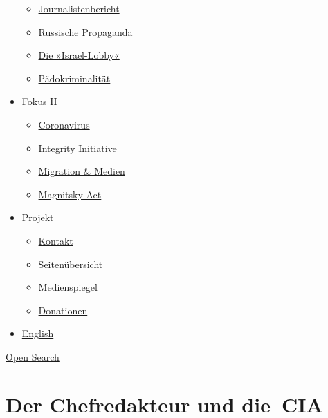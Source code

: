 \begin{itemize}
  \begin{itemize}
  \tightlist
  \item
    \href{https://swprs.org/bericht-eines-journalisten/}{Journalistenbericht}
  \item
    \href{https://swprs.org/russische-propaganda/}{Russische Propaganda}
  \item
    \href{https://swprs.org/die-israel-lobby-fakten-und-mythen/}{Die
    »Israel-Lobby«}
  \item
    \href{https://swprs.org/geopolitik-und-paedokriminalitaet/}{Pädokriminalität}
  \end{itemize}
\item
  \href{https://swprs.org/migration-und-medien/}{Fokus II}

  \begin{itemize}
  \tightlist
  \item
    \href{https://swprs.org/covid-19-hinweis-ii/}{Coronavirus}
  \item
    \href{https://swprs.org/die-integrity-initiative/}{Integrity
    Initiative}
  \item
    \href{https://swprs.org/migration-und-medien/}{Migration \& Medien}
  \item
    \href{https://swprs.org/der-fall-magnitsky/}{Magnitsky Act}
  \end{itemize}
\item
  \href{https://swprs.org/kontakt/}{Projekt}

  \begin{itemize}
  \tightlist
  \item
    \href{https://swprs.org/kontakt/}{Kontakt}
  \item
    \href{https://swprs.org/uebersicht/}{Seitenübersicht}
  \item
    \href{https://swprs.org/medienspiegel/}{Medienspiegel}
  \item
    \href{https://swprs.org/donationen/}{Donationen}
  \end{itemize}
\item
  \href{https://swprs.org/contact/}{English}
\end{itemize}

\protect\hyperlink{}{Open Search}

\hypertarget{der-chefredakteur-und-die-cia}{%
\section{Der Chefredakteur und
die~CIA}\label{der-chefredakteur-und-die-cia}}

